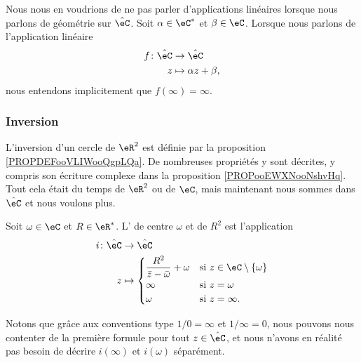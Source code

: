 Nous nous en voudrions de ne pas parler d'applications linéaires lorsque nous parlons de géométrie sur \( \hat \eC\). Soit \( \alpha\in \eC^*\) et \( \beta\in \eC\). Lorsque nous parlons de l'application linéaire
\begin{equation}
    \begin{aligned}
        f\colon \hat\eC&\to \hat\eC \\
        z&\mapsto \alpha z+\beta, 
    \end{aligned}
\end{equation}
nous entendons implicitement que \( f(\infty)=\infty\).

\subsubsection{Inversion}
\label{SSUBSooPOUNooTPilbE}

L'inversion d'un cercle de \( \eR^2\) est définie par la proposition \ref{PROPDEFooVLIWooQgpLQa}. De nombreuses propriétés y sont décrites, y compris son écriture complexe dans la proposition \ref{PROPooEWXNooNshvHq}. Tout cela était du temps de \( \eR^2\) ou de \( \eC\), mais maintenant nous sommes dans \( \hat \eC\) et nous voulons plus.

\begin{definition}       \label{DEFooIUTZooWRaXts}
    Soit \( \omega\in \eC\) et \( R\in \eR^*\). L' de centre \( \omega\) et de  \( R^2\) est l'application 
    \begin{equation}
        \begin{aligned}
            i\colon \hat \eC&\to \hat \eC \\
            z&\mapsto \begin{cases}
                \dfrac{ R^2 }{ \bar z-\bar \omega }+\omega    &   \text{si } z\in \eC\setminus\{ \omega \}\\
                 \infty   &    \text{si } z=\omega\\
                 \omega   &    \text{si } z=\infty.
            \end{cases}
        \end{aligned}
    \end{equation}
\end{definition}
Notons que grâce aux conventions type \( 1/0=\infty\) et \( 1/\infty=0\), nous pouvons nous contenter de la première formule pour tout \( z\in \hat \eC\), et nous n'avons en réalité pas besoin de décrire \( i(\infty)\) et \( i(\omega)\) séparément.

